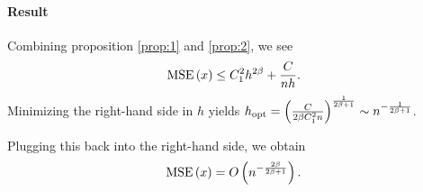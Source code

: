 \paragraph{Result}
  Combining proposition \ref{prop:1} and \ref{prop:2}, we see
  \begin{equation*}
    \mathrm{MSE} \left(x\right)\leq C_1^2 h^{2\beta} + \frac{C}{nh}.
  \end{equation*}
  Minimizing the right-hand side in $h$ yields $h_{\mathrm{opt}}= \left(\frac{C}{2\beta C_1^2 n}\right)^{\frac{1}{2\beta +1}}\sim n^{-\frac{1}{2\beta +1}}$.

  Plugging this back into the right-hand side, we obtain
  \begin{equation*}
    \mathrm{MSE}\left(x\right) = O\left(n^{-\frac{2\beta}{2\beta+1}}\right).
  \end{equation*}
